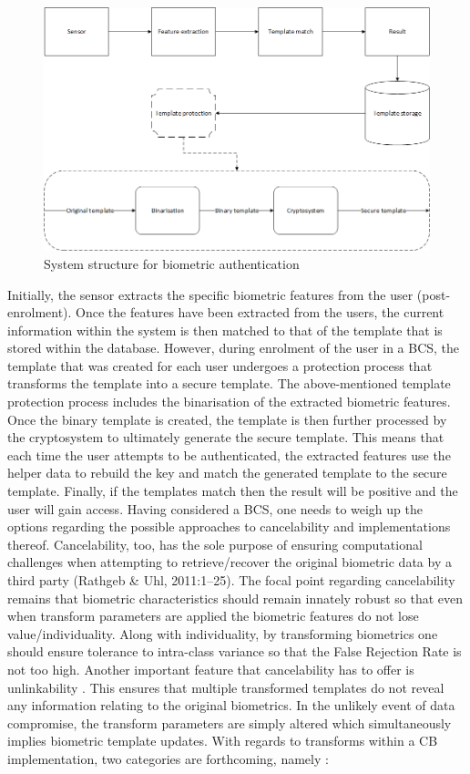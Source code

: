 \begin{figure}[htbp!] 
\centering    
\includegraphics[width=1.0\textwidth]{Chapter2/Figs/Figure2-1.png}
\caption[System structure for biometric authentication]{System structure for biometric authentication}
\label{fig:System structure for biometric authentication}
\end{figure}

Initially, the sensor extracts the specific biometric features from the user (post-enrolment). Once the features have been extracted from the users, the current information within the system is then matched to that of the template that is stored within the database. However, during enrolment of the user in a BCS, the template that was created for each user undergoes a protection process that transforms the template into a secure template. The above-mentioned template protection process includes the binarisation of the extracted biometric features. Once the binary template is created, the template is then further processed by the cryptosystem to ultimately generate the secure template. This means that each time the user attempts to be authenticated, the extracted features use the helper data to rebuild the key and match the generated template to the secure template. Finally, if the templates match then the result will be positive and the user will gain access. 
Having considered a BCS, one needs to weigh up the options regarding the possible approaches to cancelability and implementations thereof. Cancelability, too, has the sole purpose of ensuring computational challenges when attempting to retrieve/recover the original biometric data by a third party (Rathgeb \& Uhl, 2011:1–25). The focal point regarding cancelability remains that biometric characteristics should remain innately robust so that even when transform parameters are applied the biometric features do not lose value/individuality. Along with individuality, by transforming biometrics one should ensure tolerance to intra-class variance so that the False Rejection Rate is not too high. Another important feature that cancelability has to offer is unlinkability \citep{Rathgeb2011}. This ensures that multiple transformed templates do not reveal any information relating to the original biometrics. In the unlikely event of data compromise, the transform parameters are simply altered which simultaneously implies biometric template updates. 
With regards to transforms within a CB implementation, two categories are forthcoming, namely \citep{Jain2016}:
  

